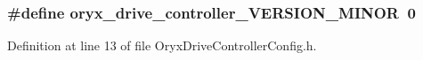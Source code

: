 \subsubsection[{oryx\-\_\-drive\-\_\-controller\-\_\-\-V\-E\-R\-S\-I\-O\-N\-\_\-\-M\-I\-N\-O\-R}]{\setlength{\rightskip}{0pt plus 5cm}\#define {\bf oryx\-\_\-drive\-\_\-controller\-\_\-\-V\-E\-R\-S\-I\-O\-N\-\_\-\-M\-I\-N\-O\-R}~0}\label{OryxDriveControllerConfig_8h_ae82c976d95f333b40fe411ce6d34825c}


\-Definition at line 13 of file \-Oryx\-Drive\-Controller\-Config.\-h.

